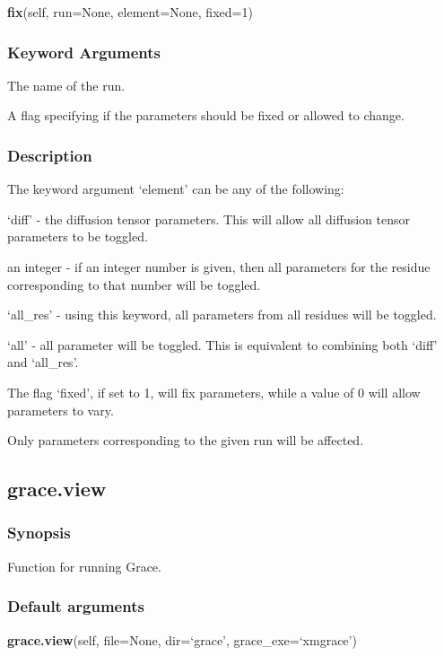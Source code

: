 \textsf{\textbf{fix}(self, run=None, element=None, fixed=1)}


\subsubsection{Keyword Arguments}

  The name of the run.

  A flag specifying if the parameters should be fixed or allowed to change.

\subsubsection{Description}

The keyword argument `element' can be any of the following:

`diff' - the diffusion tensor parameters.  This will allow all diffusion tensor parameters
to be toggled.

an integer - if an integer number is given, then all parameters for the residue
corresponding to that number will be toggled.

`all\_res' - using this keyword, all parameters from all residues will be toggled.

`all' - all parameter will be toggled.  This is equivalent to combining both `diff' and
`all\_res'.


The flag `fixed', if set to 1, will fix parameters, while a value of 0 will allow parameters
to vary.


Only parameters corresponding to the given run will be affected.


\newpage

\subsection{grace.view}


\subsubsection{Synopsis}

Function for running Grace.

\subsubsection{Default arguments}

\textsf{\textbf{grace.view}(self, file=None, dir=`grace', grace\_exe=`xmgrace')}



